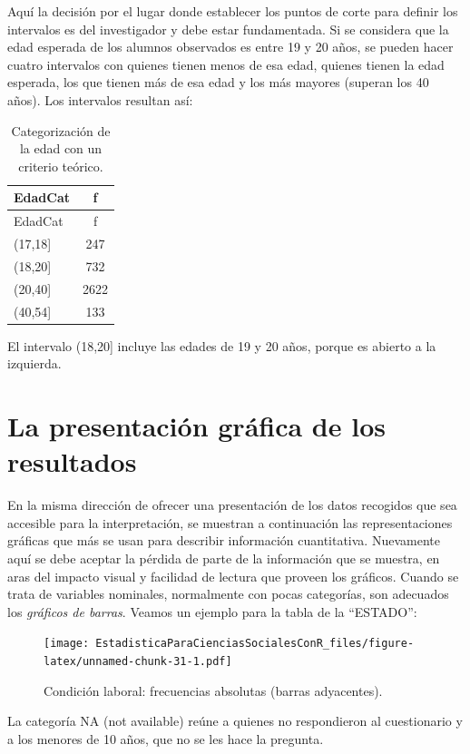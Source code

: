 \documentclass[]{book}
\begin{document}
Aquí la decisión por el lugar donde establecer los puntos de corte para definir los intervalos es del investigador y debe estar fundamentada. Si se considera que la edad esperada de los alumnos observados es entre 19 y 20 años, se pueden hacer cuatro intervalos con quienes tienen menos de esa edad, quienes tienen la edad esperada, los que tienen más de esa edad y los más mayores (superan los 40 años). Los intervalos resultan así:

\begin{longtable}[]{@{}lc@{}}
\caption{\label{tab:unnamed-chunk-30}Categorización de la edad con un criterio teórico.}\tabularnewline
\toprule
EdadCat & f\tabularnewline
\midrule
\endfirsthead
\toprule
EdadCat & f\tabularnewline
\midrule
\endhead
(17,18{]} & 247\tabularnewline
(18,20{]} & 732\tabularnewline
(20,40{]} & 2622\tabularnewline
(40,54{]} & 133\tabularnewline
\bottomrule
\end{longtable}

El intervalo (18,20{]} incluye las edades de 19 y 20 años, porque es abierto a la izquierda.

\hypertarget{la-presentaciuxf3n-gruxe1fica-de-los-resultados}{%
\section{La presentación gráfica de los resultados}\label{la-presentaciuxf3n-gruxe1fica-de-los-resultados}}

En la misma dirección de ofrecer una presentación de los datos recogidos que sea accesible para la interpretación, se muestran a continuación las representaciones gráficas que más se usan para describir información cuantitativa. Nuevamente aquí se debe aceptar la pérdida de parte de la información que se muestra, en aras del impacto visual y facilidad de lectura que proveen los gráficos.
Cuando se trata de variables nominales, normalmente con pocas categorías, son adecuados los \emph{gráficos de barras}. Veamos un ejemplo para la tabla de la ``ESTADO'':

\begin{figure}
\centering
\texttt{[image: EstadisticaParaCienciasSocialesConR\_files/figure-latex/unnamed-chunk-31-1.pdf]}
\caption{\label{fig:unnamed-chunk-31}Condición laboral: frecuencias absolutas (barras adyacentes).}
\end{figure}

La categoría NA (not available) reúne a quienes no respondieron al cuestionario y a los menores de 10 años, que no se les hace la pregunta.
\end{document}
